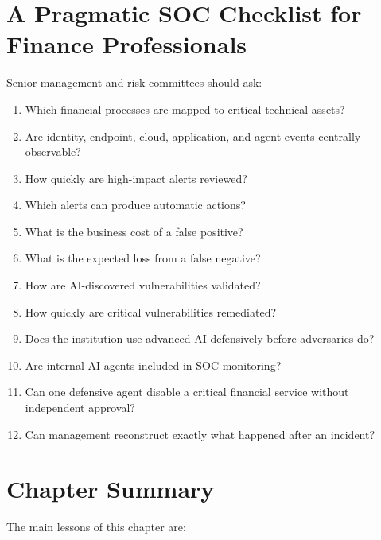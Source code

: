 \section{A Pragmatic SOC Checklist for Finance Professionals}

Senior management and risk committees should ask:

\begin{enumerate}
    \item Which financial processes are mapped to critical technical assets?
    \item Are identity, endpoint, cloud, application, and agent events centrally observable?
    \item How quickly are high-impact alerts reviewed?
    \item Which alerts can produce automatic actions?
    \item What is the business cost of a false positive?
    \item What is the expected loss from a false negative?
    \item How are AI-discovered vulnerabilities validated?
    \item How quickly are critical vulnerabilities remediated?
    \item Does the institution use advanced AI defensively before adversaries do?
    \item Are internal AI agents included in SOC monitoring?
    \item Can one defensive agent disable a critical financial service without independent approval?
    \item Can management reconstruct exactly what happened after an incident?
\end{enumerate}

\section{Chapter Summary}

The main lessons of this chapter are:

